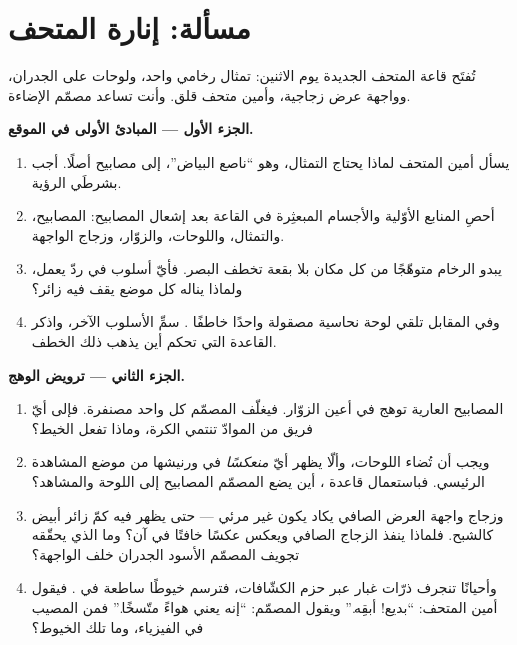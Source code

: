 \section{مسألة: إنارة المتحف}

\begin{problem}\label{pb:g7:light-sources-propagation:1}
تُفتَح قاعة المتحف الجديدة يوم الاثنين: تمثال رخامي واحد،
ولوحات على الجدران، وواجهة عرض زجاجية، وأمين متحف قلق. وأنت
تساعد مصمّم الإضاءة.

\medskip\noindent\textbf{الجزء الأول --- المبادئ الأولى في
الموقع.}
\begin{enumerate}
  \item يسأل أمين المتحف لماذا يحتاج التمثال، وهو ``ناصع
        البياض''، إلى مصابيح أصلًا. أجب بشرطَي الرؤية.
  \item أحصِ المنابع الأوّلية والأجسام المبعثِرة في القاعة بعد
        إشعال المصابيح: المصابيح، والتمثال، واللوحات،
        والزوّار، وزجاج الواجهة.
  \item يبدو الرخام متوهّجًا من كل مكان بلا بقعة تخطف البصر.
        فأيّ أسلوب في ردّ  يعمل، ولماذا يناله كل موضع
        يقف فيه زائر؟
  \item وفي المقابل تلقي لوحة نحاسية مصقولة  واحدًا
        خاطفًا . سمِّ الأسلوب الآخر، واذكر القاعدة التي
        تحكم أين يذهب ذلك الخطف.
\end{enumerate}

\medskip\noindent\textbf{الجزء الثاني --- ترويض الوهج.}
\begin{enumerate}[resume]
  \item المصابيح العارية توهج في أعين الزوّار. فيغلّف المصمّم
        كل واحد  مصنفرة. فإلى أيّ فريق من الموادّ تنتمي
        الكرة، وماذا تفعل  الخيط؟
  \item ويجب أن تُضاء اللوحات، وألّا يظهر أيّ 
        \emph{منعكسًا} في ورنيشها من موضع المشاهدة الرئيسي.
        فباستعمال قاعدة ، أين يضع المصمّم المصابيح
         إلى اللوحة والمشاهد؟
  \item وزجاج واجهة العرض الصافي يكاد يكون غير مرئي --- حتى
        يظهر فيه كمّ زائر أبيض كالشبح. فلماذا ينفذ الزجاج
        الصافي ويعكس عكسًا خافتًا في آن؟ وما الذي يحقّقه
        تجويف المصمّم الأسود الجدران خلف الواجهة؟
  \item وأحيانًا تنجرف ذرّات غبار عبر حزم الكشّافات، فترسم
        خيوطًا ساطعة في . فيقول أمين المتحف: ``بديع!
        أبقِه.'' ويقول المصمّم: ``إنه يعني هواءً متّسخًا.''
        فمن المصيب في الفيزياء، وما تلك الخيوط؟
\end{enumerate}


\end{problem}
